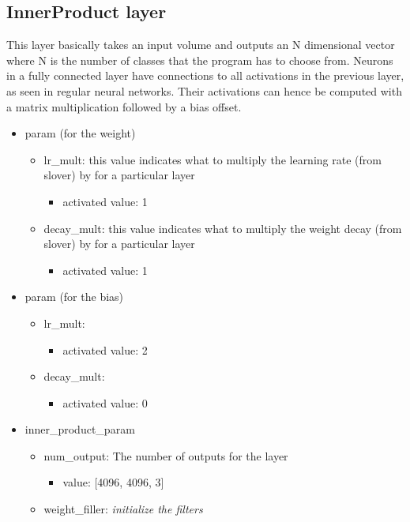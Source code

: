 \documentclass[11pt]{article}
\begin{document}
\subsection{InnerProduct layer}
This layer basically takes an input volume and outputs an N dimensional vector where N is the number of classes that the program has to choose from. Neurons in a fully connected layer have connections to all activations in the previous layer, as seen in regular neural networks. Their activations can hence be computed with a matrix multiplication followed by a bias offset.
\begin{itemize}
	\item param (for the weight)
	\begin{itemize}
		\item lr\_mult: this value indicates what to multiply the learning rate (from slover) by for a particular layer
			\begin{itemize}
				\item activated value: 1
			\end{itemize}
		\item decay\_mult: this value indicates what to multiply the weight decay (from slover) by for a particular layer
			\begin{itemize}
				\item activated value: 1
			\end{itemize}
	\end{itemize}
	\item param (for the bias)
	\begin{itemize}
		\item lr\_mult: 
			\begin{itemize}
				\item activated value: 2
			\end{itemize}
		\item decay\_mult:
			\begin{itemize}
				\item activated value: 0
			\end{itemize}
	\end{itemize}
	\item inner\_product\_param
	\begin{itemize}
		\item num\_output: The number of outputs for the layer
		\begin{itemize}
			\item value: [4096, 4096, 3]
		\end{itemize}
		\item weight\_filler: \textit{initialize the filters}

\end{itemize}
\end{itemize}
\end{document}
